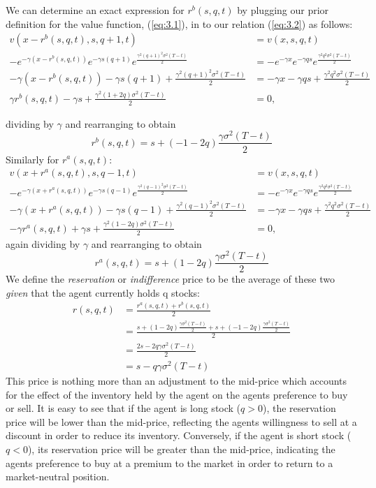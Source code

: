 We can determine an exact expression for $r^b(s,q,t)$ by plugging our prior definition
for the value function, (\ref{eq:3.1}), in to our relation (\ref{eq:3.2}) as follows:
\begin{align*}
    v(x-r^b(s,q,t),s,q+1,t)&=v(x,s,q,t)\\
    -e^{-\gamma(x-r^b(s,q,t))}e^{-\gamma s(q+1)}e^{\frac{\gamma^2(q+1)^2\sigma^2(T-t)}{2}}&=-e^{-\gamma x}e^{-\gamma q s}e^{\frac{\gamma^2q^2\sigma^2(T-t)}{2}}\\
    -\gamma(x-r^b(s,q,t))-\gamma s(q+1) + \frac{\gamma^2(q+1)^2\sigma^2(T-t)}{2} &= -\gamma x-\gamma q s + \frac{\gamma^2q^2\sigma^2(T-t)}{2}\\
    \gamma r^b(s,q,t)-\gamma s + \frac{\gamma^2(1+2q)\sigma^2(T-t)}{2} &=0,
\end{align*}

dividing by $\gamma$ and rearranging to obtain
\begin{equation}
    r^b(s,q,t)=s+(-1-2q)\frac{\gamma\sigma^2(T-t)}{2}
\end{equation}
Similarly for $r^a(s,q,t)$:
\begin{align*}
    v(x+r^a(s,q,t),s,q-1,t)&=v(x,s,q,t)\\
    -e^{-\gamma(x+r^a(s,q,t))}e^{-\gamma s(q-1)}e^{\frac{\gamma^2(q-1)^2\sigma^2(T-t)}{2}}&=-e^{-\gamma x}e^{-\gamma q s}e^{\frac{\gamma^2q^2\sigma^2(T-t)}{2}}\\
    -\gamma(x+r^a(s,q,t))-\gamma s(q-1)+\frac{\gamma^2(q-1)^2\sigma^2(T-t)}{2}&=-\gamma x-\gamma q s + \frac{\gamma^2q^2\sigma^2(T-t)}{2}\\
    -\gamma r^a(s,q,t) + \gamma s + \frac{\gamma^2(1-2q)\sigma^2(T-t)}{2}&=0,
\end{align*}
again dividing by $\gamma$ and rearranging to obtain
\begin{equation}
    r^a(s,q,t)=s+(1-2q)\frac{\gamma\sigma^2(T-t)}{2}
\end{equation}
We define the \emph{reservation} or \emph{indifference} price to be the average of 
these two \textit{given} that the agent currently holds q stocks:
\begin{align*}
    r(s,q,t)&=\frac{r^a(s,q,t)+r^b(s,q,t)}{2}\\
    &=\frac{s+(1-2q)\frac{\gamma\sigma^2(T-t)}{2}+s+(-1-2q)\frac{\gamma\sigma^2(T-t)}{2}}{2}\\
    &=\frac{2s-2q\gamma\sigma^2(T-t)}{2}\\
    &=s-q\gamma\sigma^2(T-t)
\end{align*}
This price is nothing more than an adjustment to the mid-price which accounts for the 
effect of the inventory held by the agent on the agents preference to buy or sell. It
is easy to see that if the agent is long stock ($q>0$), the reservation price will be 
lower than the mid-price, reflecting the agents willingness to sell at a discount in 
order to reduce its inventory. Conversely, if the agent is short stock ($q<0$), its 
reservation price will be greater than the mid-price, indicating the agents preference
to buy at a premium to the market in order to return to a market-neutral position.

